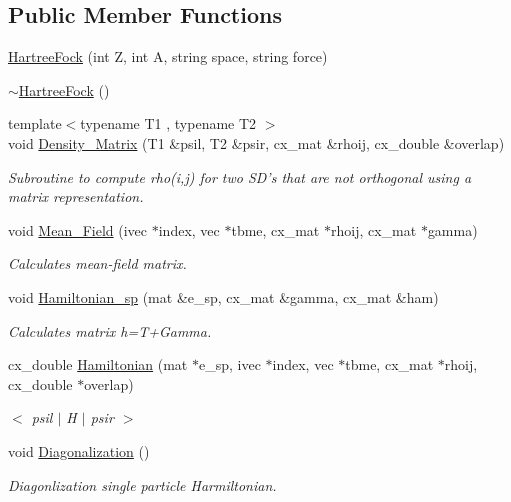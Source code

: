 \subsection*{Public Member Functions}
\begin{DoxyCompactItemize}
\item 
\hyperlink{class_hartree_fock_a0138ea06db729472531ba768af7d0f4f}{Hartree\-Fock} (int Z, int A, string space, string force)
\item 
\hyperlink{class_hartree_fock_a82ad40272840da4287b9a602415beac4}{$\sim$\-Hartree\-Fock} ()
\item 
{\footnotesize template$<$typename T1 , typename T2 $>$ }\\void \hyperlink{class_hartree_fock_a455afd726ee175800c437ac957fab978}{Density\-\_\-\-Matrix} (T1 \&psil, T2 \&psir, cx\-\_\-mat \&rhoij, cx\-\_\-double \&overlap)
\begin{DoxyCompactList}\small\item\em Subroutine to compute rho(i,j) for two S\-D's that are not orthogonal using a matrix representation. \end{DoxyCompactList}\item 
void \hyperlink{class_hartree_fock_a489618a047bfb88057bd50d73d79c2e3}{Mean\-\_\-\-Field} (ivec $\ast$index, vec $\ast$tbme, cx\-\_\-mat $\ast$rhoij, cx\-\_\-mat $\ast$gamma)
\begin{DoxyCompactList}\small\item\em Calculates mean-\/field matrix. \end{DoxyCompactList}\item 
void \hyperlink{class_hartree_fock_af85bdddebed73f27c2b883c2d9e8972e}{Hamiltonian\-\_\-sp} (mat \&e\-\_\-sp, cx\-\_\-mat \&gamma, cx\-\_\-mat \&ham)
\begin{DoxyCompactList}\small\item\em Calculates matrix h=T+\-Gamma. \end{DoxyCompactList}\item 
cx\-\_\-double \hyperlink{class_hartree_fock_accb7866bf87089908210f64157668914}{Hamiltonian} (mat $\ast$e\-\_\-sp, ivec $\ast$index, vec $\ast$tbme, cx\-\_\-mat $\ast$rhoij, cx\-\_\-double $\ast$overlap)
\begin{DoxyCompactList}\small\item\em $<$ psil $|$ H $|$ psir $>$ \end{DoxyCompactList}\item 
void \hyperlink{class_hartree_fock_a78d4a33402c7d999286bdc164cc853b5}{Diagonalization} ()
\begin{DoxyCompactList}\small\item\em Diagonlization single particle Harmiltonian. \end{DoxyCompactList}\item 

\end{DoxyCompactItemize}

